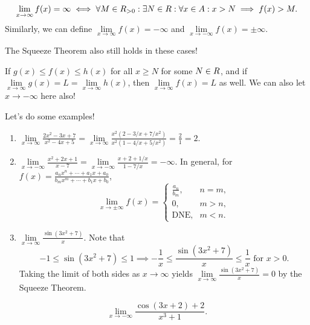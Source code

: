 \begin{Definition}{}{}
    \[ \lim\limits_{{x} \to {\infty}}f(x)=\infty\iff
        \forall M\in\relax{R}_{>0}:\exists N\in\relax{R}:\forall x\in A:x>N\implies f(x)>M. \]
    Similarly, we can define $ \lim\limits_{{x} \to {\infty}}f(x)=-\infty $ and $ \lim\limits_{{x} \to {-\infty}}f(x)=\pm \infty $.
\end{Definition}
The Squeeze Theorem also still holds in these cases!
\begin{Theorem}{}{}
    If $ g(x)\le f(x)\le h(x) $ for all $ x\ge N $ for some $ N\in\relax{R} $, and if $ \lim\limits_{{x} \to {\infty}}g(x)=L=\lim\limits_{{x} \to {\infty}}h(x) $,
    then $ \lim\limits_{{x} \to {\infty}}f(x)=L $ as well. We can also let $ x\to-\infty $ here also!
\end{Theorem}
Let's do some examples!
\begin{Example}{}{}
    \begin{enumerate}[(1)]
        \item $ \displaystyle \lim\limits_{{x} \to {\infty}}\frac{2x^2-3x+7}{x^2-4x+5}=\lim\limits_{{x} \to {\infty}}\frac{x^2(2-3/x+7/x^2)}{x^2(1-4/x+5/x^2)}=\frac{2}{1}=2 $.
        \item $ \displaystyle \lim\limits_{{x} \to {-\infty}}\frac{x^2+2x+1}{x-7}=\lim\limits_{{x} \to {-\infty}}\frac{x+2+1/x}{1-7/x}=-\infty $.
              In general, for $ f(x)=\frac{a_n x^n+\cdots+a_1 x+a_0}{b_m x^m+\cdots+b_1x+b_0} $,
              \[ \lim\limits_{{x} \to {\pm\infty}}f(x)=\begin{cases}
                      \frac{a_n}{b_m}, & n=m, \\
                      0,               & m>n, \\
                      \text{DNE},      & m<n.
                  \end{cases} \]
        \item $ \displaystyle \lim\limits_{{x} \to {\infty}}\frac{\sin(3x^2+7)}{x} $. Note that
              \[ -1\le \sin(3x^2+7)\le 1\implies -\frac{1}{x}\le \frac{\sin(3x^2+7)}{x}\le \frac{1}{x}\text{ for $x>0$}. \]
              Taking the limit of both sides as $ x\to\infty $ yields $ \lim\limits_{{x} \to {\infty}}\frac{\sin(3x^2+7)}{x}=0 $
              by the Squeeze Theorem.
    \end{enumerate}
\end{Example}
\begin{Exercise}{}{}
    \[ \lim\limits_{{x} \to {-\infty}}\frac{\cos(3x+2)+2}{x^3+1}. \]
\end{Exercise}

